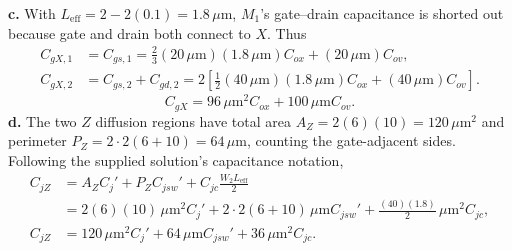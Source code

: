 \textbf{c.} With $L_{\mathrm{eff}}=2-2(0.1)=1.8\,\mu\mathrm m$, $M_1$'s gate--drain capacitance is shorted out because gate and drain both connect to $X$. Thus
\begin{align*}
C_{gX,1}&=C_{gs,1}=\frac23(20\,\mu\mathrm m)(1.8\,\mu\mathrm m)C_{ox}
 +(20\,\mu\mathrm m)C_{ov},\\
C_{gX,2}&=C_{gs,2}+C_{gd,2}
=2\left[\frac12(40\,\mu\mathrm m)(1.8\,\mu\mathrm m)C_{ox}
 +(40\,\mu\mathrm m)C_{ov}\right].
\end{align*}
\[
\boxed{C_{gX}=96\,\mu\mathrm m^2 C_{ox}+100\,\mu\mathrm m C_{ov}.}
\]
\textbf{d.} The two $Z$ diffusion regions have total area $A_Z=2(6)(10)=120\,\mu\mathrm m^2$ and perimeter $P_Z=2\cdot2(6+10)=64\,\mu\mathrm m$, counting the gate-adjacent sides. Following the supplied solution's capacitance notation,
\begin{align*}
C_{jZ}&=A_ZC_j'+P_ZC_{jsw}'+C_{jc}\frac{W_2L_{\mathrm{eff}}}{2}\\
&=2(6)(10)\,\mu\mathrm m^2C_j'+2\cdot2(6+10)\,\mu\mathrm m C_{jsw}'
 +\frac{(40)(1.8)}2\,\mu\mathrm m^2C_{jc},\\[-4pt]
\boxed{C_{jZ}}&\boxed{=120\,\mu\mathrm m^2C_j'+64\,\mu\mathrm m C_{jsw}'+36\,\mu\mathrm m^2C_{jc}.}
\end{align*}
\endgroup
\newpage

